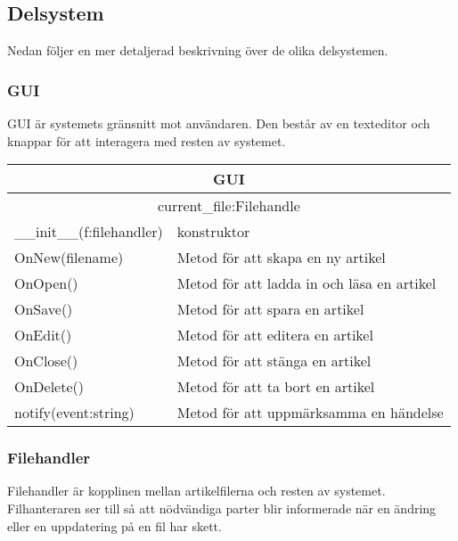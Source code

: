 \subsection{Delsystem}
Nedan följer en mer detaljerad beskrivning över de olika delsystemen.
\subsubsection{GUI}
GUI är systemets gränsnitt mot användaren. Den består av en texteditor och knappar för att interagera med resten av systemet.


\begin{tabular}{|l|l|}
\hline
\multicolumn{2}{|c|}{\textbf{GUI}} \\
\hline
\multicolumn{2}{|c|}{current\_file:Filehandle} \\
\hline
\_\_init\_\_(f:filehandler) &konstruktor\\
OnNew(filename) & Metod för att skapa en ny artikel\\
OnOpen() & Metod för att ladda in och läsa en artikel \\ 
OnSave() & Metod för att spara en artikel \\
OnEdit() & Metod för att editera en artikel \\
OnClose() & Metod för att stänga en artikel \\
OnDelete() & Metod för att ta bort en artikel\\
notify(event:string) & Metod för att uppmärksamma en händelse\\
\hline
\end{tabular}

\subsubsection{Filehandler}
Filehandler är kopplinen mellan artikelfilerna och resten av systemet. Filhanteraren ser till så att nödvändiga parter blir informerade när en ändring eller en uppdatering på en fil har skett. 

